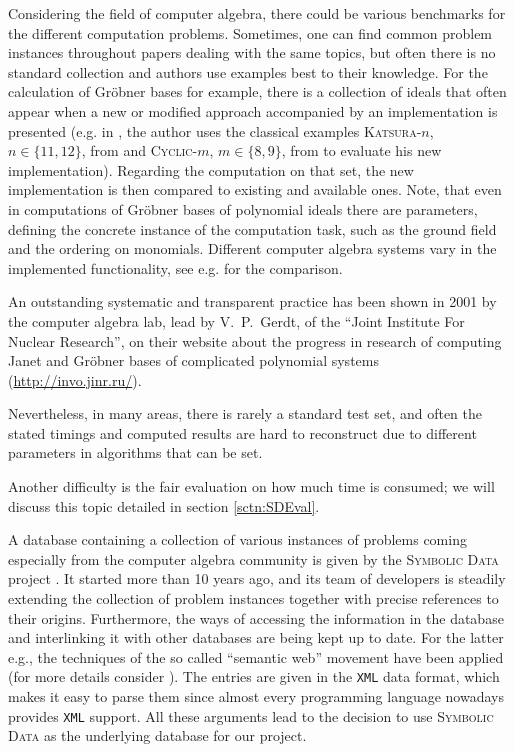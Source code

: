 \documentclass[12pt]{article}
\begin{document}
Considering the field of computer algebra, there could be various benchmarks
for the different computation problems. Sometimes, one can find common problem
instances throughout papers dealing with the same topics, but often there is no
standard collection and authors use examples best to their knowledge. For the
calculation of Gr\"obner bases for example, there is a collection of ideals
that often appear when a new or modified approach accompanied by an
implementation is presented (e.g. in \cite{sneumann2012Parallel}, the author
uses the classical examples \textsc{Katsura}-$n$, $n \in \{11,12\}$, from
\cite{katsura1987distribution} and \textsc{Cyclic}-$m$, $m \in \{8,9\}$, from
\cite{bjorck2008all} to evaluate his new implementation). Regarding the
computation on that set, the new implementation is then compared to existing
and available ones. Note, that even in computations of Gr\"obner bases of
polynomial ideals there are parameters, defining the concrete instance of the
computation task, such as the ground field and the ordering on
monomials. Different computer algebra systems vary in the implemented
functionality, see e.g. \cite{GBImpl} for the comparison.

An outstanding systematic and transparent practice has been shown in 2001 by
the computer algebra lab, lead by V.~P.~Gerdt, of the ``Joint Institute For
Nuclear Research'', on their website about the progress in research of
computing Janet and Gr\"obner bases of complicated polynomial systems
(\url{http://invo.jinr.ru/}).

Nevertheless, in many areas, there is rarely a standard test set, and often the
stated timings and computed results are hard to reconstruct due to different
parameters in algorithms that can be set.

Another difficulty is the fair evaluation on how much time is consumed; we will
discuss this topic detailed in section \ref{sctn:SDEval}.

A database containing a collection of various instances of problems coming
especially from the computer algebra community is given by the \textsc{Symbolic
  Data} project \cite{grabe2006symbolicdata}. It started more than 10 years
ago, and its team of developers is steadily extending the collection of problem
instances together with precise references to their origins. Furthermore, the
ways of accessing the information in the database and interlinking it with
other databases are being kept up to date. For the latter e.g., the techniques
of the so called ``semantic web'' movement have been applied (for more details
consider \cite{grabe2013symbolicdata}). The entries are given in the
\texttt{XML} data format, which makes it easy to parse them since almost every
programming language nowadays provides \texttt{XML} support. All these
arguments lead to the decision to use \textsc{Symbolic Data} as the underlying
database for our project.
\end{document}

